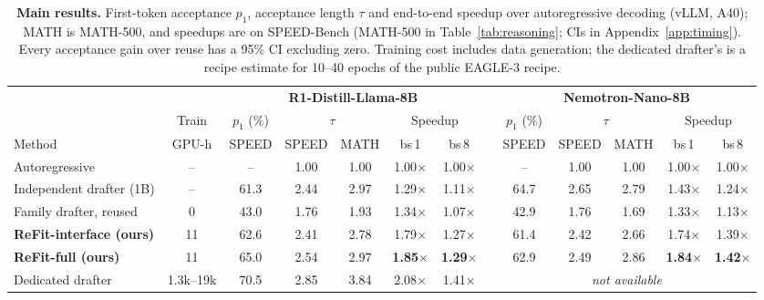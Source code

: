 \documentclass[11pt]{article}
\newcommand{\refitI}{ReFit-interface}
\newcommand{\refitF}{ReFit-full}
\begin{document}
\begin{table}[t]
  \centering
  \small
  \setlength{\tabcolsep}{3.0pt}
  \begin{tabular}{@{}l c ccccc c ccccc@{}}
    \toprule
    & & \multicolumn{5}{c}{\textbf{R1-Distill-Llama-8B}} & & \multicolumn{5}{c}{\textbf{Nemotron-Nano-8B}} \\
    \cmidrule(lr){3-7} \cmidrule(lr){9-13}
    & Train & $p_1$ (\%) & \multicolumn{2}{c}{$\tau$} & \multicolumn{2}{c}{Speedup} & & $p_1$ (\%) & \multicolumn{2}{c}{$\tau$} & \multicolumn{2}{c}{Speedup} \\
    \cmidrule(lr){3-3} \cmidrule(lr){4-5} \cmidrule(lr){6-7} \cmidrule(lr){9-9} \cmidrule(lr){10-11} \cmidrule(lr){12-13}
    Method & GPU-h & SPEED & SPEED & MATH & bs\,1 & bs\,8 & & SPEED & SPEED & MATH & bs\,1 & bs\,8 \\
    \midrule
    Autoregressive & -- & -- & 1.00 & 1.00 & 1.00$\times$ & 1.00$\times$ & & -- & 1.00 & 1.00 & 1.00$\times$ & 1.00$\times$ \\
    Independent drafter (1B) & -- & 61.3 & 2.44 & 2.97 & 1.29$\times$ & 1.11$\times$ & & 64.7 & 2.65 & 2.79 & 1.43$\times$ & 1.24$\times$ \\
    Family drafter, reused & 0 & 43.0 & 1.76 & 1.93 & 1.34$\times$ & 1.07$\times$ & & 42.9 & 1.76 & 1.69 & 1.33$\times$ & 1.13$\times$ \\
    \midrule
    \textbf{\refitI{} (ours)} & 11 & 62.6 & 2.41 & 2.78 & 1.79$\times$ & 1.27$\times$ & & 61.4 & 2.42 & 2.66 & 1.74$\times$ & 1.39$\times$ \\
    \textbf{\refitF{} (ours)} & 11 & 65.0 & 2.54 & 2.97 & \textbf{1.85$\times$} & \textbf{1.29$\times$} & & 62.9 & 2.49 & 2.86 & \textbf{1.84$\times$} & \textbf{1.42$\times$} \\
    \midrule
    \textcolor{black!60}{Dedicated drafter} & \textcolor{black!60}{1.3k--19k} & \textcolor{black!60}{70.5} & \textcolor{black!60}{2.85} & \textcolor{black!60}{3.84} & \textcolor{black!60}{2.08$\times$} & \textcolor{black!60}{1.41$\times$} & & \multicolumn{5}{c}{\textcolor{black!60}{\emph{not available}}} \\
    \bottomrule
  \end{tabular}
  \caption{\textbf{Main results.} First-token acceptance $p_1$, acceptance length $\tau$ and end-to-end speedup over autoregressive decoding (vLLM, A40); MATH is MATH-500, and speedups are on SPEED-Bench (MATH-500 in Table~\ref{tab:reasoning}; CIs in Appendix~\ref{app:timing}). Every acceptance gain over reuse has a 95\% CI excluding zero. Training cost includes data generation; the dedicated drafter's is a recipe estimate for 10--40 epochs of the public EAGLE-3 recipe.}
  \label{tab:main}
\end{table}
\end{document}
